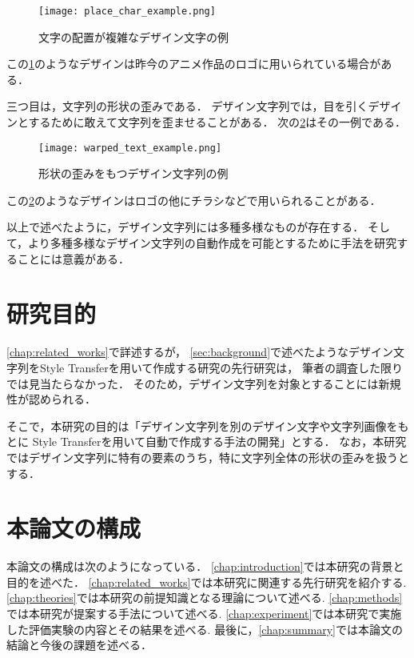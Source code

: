 \documentclass[\homedir/main.tex]{subfiles}
\begin{document}
\begin{figure}[h]
    \centering
    \texttt{[image: place\_char\_example.png]}
    \caption{文字の配置が複雑なデザイン文字の例}
    \label{fig:complex_arrange_eg}
\end{figure}

この\cref{fig:complex_arrange_eg}のようなデザインは昨今のアニメ作品のロゴに用いられている場合がある．

三つ目は，文字列の形状の歪みである．
デザイン文字列では，目を引くデザインとするために敢えて文字列を歪ませることがある．
次の\cref{fig:warp_txt_eg}はその一例である．

\begin{figure}[h]
    \centering
    \texttt{[image: warped\_text\_example.png]}
    \caption{形状の歪みをもつデザイン文字列の例}
    \label{fig:warp_txt_eg}
\end{figure}

この\cref{fig:warp_txt_eg}のようなデザインはロゴの他にチラシなどで用いられることがある．

以上で述べたように，デザイン文字列には多種多様なものが存在する．
そして，より多種多様なデザイン文字列の自動作成を可能とするために手法を研究することには意義がある．

\section{研究目的}\label{sec:objective}
\cref{chap:related_works}で詳述するが，
\cref{sec:background}で述べたようなデザイン文字列をStyle Transferを用いて作成する研究の先行研究は，
筆者の調査した限りでは見当たらなかった．
そのため，デザイン文字列を対象とすることには新規性が認められる．

そこで，本研究の目的は「デザイン文字列を別のデザイン文字や文字列画像をもとに
Style Transferを用いて自動で作成する手法の開発」とする．
なお，本研究ではデザイン文字列に特有の要素のうち，特に文字列全体の形状の歪みを扱うとする．

\section{本論文の構成}\label{sec:structure}
本論文の構成は次のようになっている．
\cref{chap:introduction}では本研究の背景と目的を述べた．
\cref{chap:related_works}では本研究に関連する先行研究を紹介する.
\cref{chap:theories}では本研究の前提知識となる理論について述べる.
\cref{chap:methods}では本研究が提案する手法について述べる.
\cref{chap:experiment}では本研究で実施した評価実験の内容とその結果を述べる.
最後に，\cref{chap:summary}では本論文の結論と今後の課題を述べる．

\printBibForSubfiles
\end{document}
